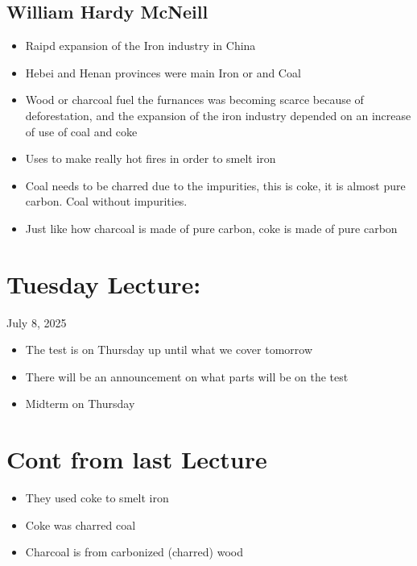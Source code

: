 \documentclass{article}
\begin{document}
\subsection{William Hardy McNeill}
\begin{itemize}
  \item Raipd expansion of the Iron industry in China
  \item Hebei and Henan provinces were main Iron or and Coal
  \item Wood or charcoal fuel the furnances was becoming scarce because of deforestation,
    and the expansion of the iron industry
    depended on an increase of use of coal and coke
  \item Uses to make really hot fires in order to smelt iron
  \item Coal needs to be charred due to the impurities, this is coke, it is almost pure
    carbon. Coal without impurities.
  \item Just like how charcoal is made of pure carbon, coke is made of pure carbon
\end{itemize}

\newpage
\section*{Tuesday Lecture:}
July 8, 2025

\begin{itemize}
  \item The test is on Thursday up until what we cover tomorrow
  \item There will be an announcement on what parts will be on the test
  \item Midterm on Thursday
\end{itemize}


\section*{Cont from last Lecture}
\begin{itemize}
  \item They used coke to smelt iron
  \item Coke was charred coal
  \item Charcoal is from carbonized (charred) wood
\end{itemize}
\end{document}
